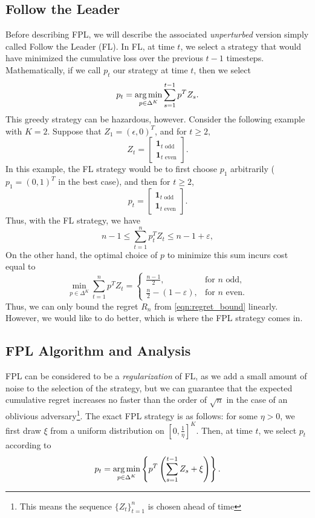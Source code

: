 \subsection{Follow the Leader}
Before describing FPL, we will describe the associated \emph{unperturbed} version simply called Follow the Leader (FL). In FL, at time $t$, we select a strategy that would have minimized the cumulative loss over the previous $t-1$ timesteps. Mathematically, if we call $p_t$ our strategy at time $t$, then we select 
\[
p_t = \operatorname*{arg\,min}_{p \in \Delta^K} \sum_{s=1}^{t-1} p^T Z_s.
\]
This greedy strategy can be hazardous, however. Consider the following example with $K = 2$. Suppose that $Z_1 = (\epsilon, 0)^T$, and for $t \geq 2,$
\[
Z_t = \begin{bmatrix}
\mathbf{1}_{t \text{ odd}} \\
\mathbf{1}_{t \text{ even}}
\end{bmatrix}.
\]
In this example, the FL strategy would be to first choose $p_1$ arbitrarily ($p_1 = (0, 1)^T$ in the best case), and then for $t \geq 2$, 
\[
p_t = \begin{bmatrix}
\mathbf{1}_{t \text{ odd}} \\
\mathbf{1}_{t \text{ even}}
\end{bmatrix}.
\]
Thus, with the FL strategy, we have
\[
n - 1 \leq \sum_{t=1}^n p_t^T Z_t \leq n - 1 + \varepsilon, 
\]
On the other hand, the optimal choice of $p$ to minimize this sum incurs cost equal to
\[
  \min_{p \in \Delta^K} \sum_{t=1}^n p^T Z_t =
  \begin{cases}
    \frac{n-1}{2}, & \text{for $n$ odd}, \\
    \frac{n}{2} - (1 - \varepsilon), & \text{for $n$ even}.
  \end{cases}
\]
Thus, we can only bound the regret $R_n$ from \eqref{eqn:regret_bound} linearly. However, we would like to do better, which is where the FPL strategy comes in. 

\subsection{FPL Algorithm and Analysis}
FPL can be considered to be a \emph{regularization} of FL, as we add a small amount of noise to the selection of the strategy, but we can guarantee that the expected cumulative regret increases no faster than the order of $\sqrt{n}$ in the case of an oblivious adversary\footnote{This means the sequence $\{Z_t\}_{t=1}^n$ is chosen ahead of time}. The exact FPL strategy is as follows: for some $\eta > 0$, we first draw $\xi$ from a uniform distribution on $[0, \frac{1}{\eta}]^K$. Then, at time $t$, we select $p_t$ according to
\begin{equation} \label{eqn:FPL}
p_t = \operatorname*{arg\,min}_{p \in \Delta^K} \left\{p^T \left( \sum_{s = 1}^{t-1} Z_s + \xi\right) \right\}.
\end{equation}

